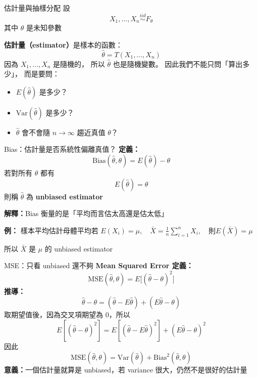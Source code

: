 \documentclass[aspectratio=169,12pt]{beamer}
\begin{document}
\begin{frame}{估計量與抽樣分配}
    設 $$X_1, \dots,X_n \overset{iid}{\sim} F_\theta$$ 其中 $\theta$ 是未知參數

    \vspace{0.5em}
    \textbf{估計量（estimator）}是樣本的函數：
    $$\hat{\theta}=T(X_1, \dots,X_n)$$ 因為 $X_1, \dots,X_n$ 是隨機的，
    所以 $\hat{\theta}$ 也是隨機變數。
    因此我們不能只問「算出多少」，
    而是要問：
        \begin{itemize}
            \item $E(\hat{\theta})$ 是多少？
            \item $\mathrm{Var}(\hat{\theta})$ 是多少？
            \item $\hat{\theta}$ 會不會隨 $n\to\infty$ 趨近真值 $\theta$？
        \end{itemize}
\end{frame}

\begin{frame}{Bias：估計量是否系統性偏離真值？}
    \textbf{定義：}
    $$\mathrm{Bias}(\hat{\theta}, \theta)=E(\hat{\theta})-\theta$$ %
    若對所有 $\theta$ 都有 
    $$E(\hat{\theta})=\theta$$ %
    則稱 $\hat{\theta}$ 為 \textbf{unbiased estimator}

    \vspace{0.8em}
    \textbf{解釋：}Bias 衡量的是「平均而言估太高還是估太低」
    
    \vspace{0.8em}
    \textbf{例：}
    樣本平均估計母體平均若 $E(X_i)=\mu, \quad\bar X=\frac1n\sum_{i=1}^n X_i, \quad$則$E(\bar X)=\mu$
    
    \vspace{0.8em}
    所以 $\bar X$ 是 $\mu$ 的 unbiased estimator
\end{frame}

\begin{frame}{MSE：只看 unbiased 還不夠}
    \vspace{-1em}
    \textbf{Mean Squared Error 定義：}
    \vspace{-0.8em}
    $$\mathrm{MSE}(\hat{\theta}, \theta)=E\big[(\hat{\theta}-\theta)^2\big]$$
    \textbf{推導：}
    $$\hat{\theta}-\theta=(\hat{\theta}-E\hat{\theta})+(E\hat{\theta}-\theta)$$
    取期望值後，因為交叉項期望為 0，所以
    \vspace{-0.8em}
    $$E[(\hat{\theta}-\theta)^2]=E[(\hat{\theta}-E\hat{\theta})^2]+(E\hat{\theta}-\theta)^2$$
    因此
    $$\boxed{\mathrm{MSE}(\hat{\theta}, \theta)=\mathrm{Var}(\hat{\theta})+\mathrm{Bias}^2(\hat{\theta}, \theta)}$$
    \textbf{意義：}一個估計量就算是 unbiased，若 variance 很大，仍然不是很好的估計量
\end{frame}
\end{document}
